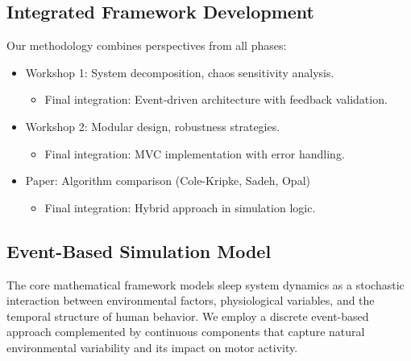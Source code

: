 \documentclass[conference]{IEEEtran}
\begin{document}
\subsection{Integrated Framework Development}
Our methodology combines perspectives from all phases:
\begin{itemize}
    \item Workshop 1: System decomposition, chaos sensitivity analysis.
    \begin{itemize}
        \item Final integration: Event-driven architecture with feedback validation.
    \end{itemize}
    \item Workshop 2: Modular design, robustness strategies.
    \begin{itemize}
        \item Final integration: MVC implementation with error handling.
    \end{itemize}
    \item Paper: Algorithm comparison (Cole-Kripke, Sadeh, Opal)
    \begin{itemize}
        \item Final integration: Hybrid approach in simulation logic.
    \end{itemize}
\end{itemize}

\subsection{Event-Based Simulation Model}
The core mathematical framework models sleep system dynamics as a stochastic interaction between environmental factors, physiological variables, and the temporal structure of human behavior. We employ a discrete event-based approach complemented by continuous components that capture natural environmental variability and its impact on motor activity.
\end{document}
